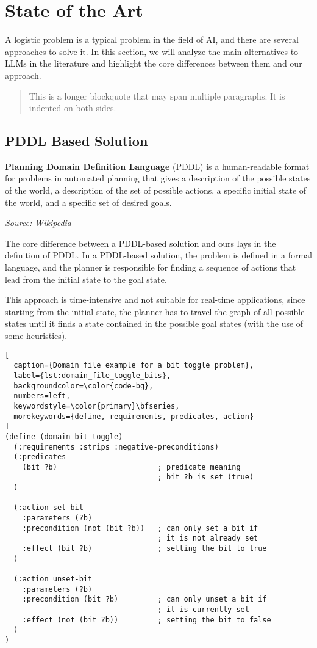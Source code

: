 \section{State of the Art}
\label{sec:state_of_the_art}

A logistic problem is a typical problem in the field of AI, and there are
several approaches to solve it. In this section, we will analyze the main
alternatives to LLMs in the literature and highlight the core differences
between them and our approach.

\begin{quotation}
  This is a longer blockquote that may span multiple paragraphs. It is indented
  on both sides.
\end{quotation}

\subsection{PDDL Based Solution}
\begin{blockquote}
  \textbf{Planning Domain Definition Language} (PDDL) is a human-readable format
  for problems in automated planning that gives a description of the possible
  states of the world, a description of the set of possible actions, a specific
  initial state of the world, and a specific set of desired goals.

  \emph{Source: Wikipedia \cite{wiki-pddl}}
\end{blockquote}

The core difference between a PDDL-based solution and ours lays in the
definition of PDDL. In a PDDL-based solution, the problem is defined in a formal
language, and the planner is responsible for finding a sequence of actions that lead
from the initial state to the goal state.

This approach is time-intensive and not suitable for real-time applications,
since starting from the initial state, the planner has to travel the graph of all
possible states until it finds a state contained in the possible goal states (with
the use of some heuristics).

\begin{lstlisting}[
  caption={Domain file example for a bit toggle problem},
  label={lst:domain_file_toggle_bits},
  backgroundcolor=\color{code-bg},
  numbers=left,
  keywordstyle=\color{primary}\bfseries,
  morekeywords={define, requirements, predicates, action}
]
(define (domain bit-toggle)
  (:requirements :strips :negative-preconditions)
  (:predicates
    (bit ?b)                       ; predicate meaning
                                   ; bit ?b is set (true)
  )

  (:action set-bit
    :parameters (?b)
    :precondition (not (bit ?b))   ; can only set a bit if
                                   ; it is not already set
    :effect (bit ?b)               ; setting the bit to true
  )

  (:action unset-bit
    :parameters (?b)
    :precondition (bit ?b)         ; can only unset a bit if
                                   ; it is currently set
    :effect (not (bit ?b))         ; setting the bit to false
  )
)
\end{lstlisting}

